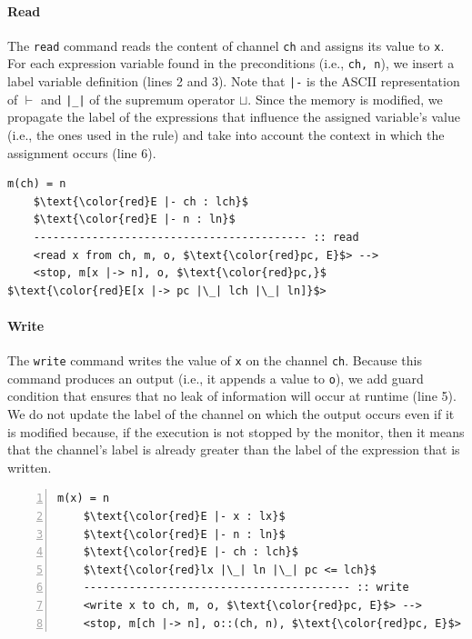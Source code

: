 \documentclass[conference]{IEEEtran}
\begin{document}
\paragraph{Read}
The \lstinline{read} command reads the content of channel \lstinline{ch} and assigns its value to \lstinline{x}. For each expression variable found in the preconditions (i.e., \lstinline{ch, n}), we insert a label variable definition (lines 2 and 3). Note that \lstinline{|-} is the ASCII representation of $\vdash$ and \lstinline{|_|} of the supremum operator $\sqcup$. Since the memory is modified, we propagate the label of the expressions that influence the assigned variable's value (i.e., the ones used in the rule) and take into account the context in which the assignment occurs (line 6).
\begin{lstlisting}[label=listing:output-semantics-read,captionpos=b,numbers=right,caption=Ott-IFC's output for the "read" command]
	m(ch) = n
	$\text{\color{red}E |- ch : lch}$
	$\text{\color{red}E |- n : ln}$
	------------------------------------------ :: read
	<read x from ch, m, o, $\text{\color{red}pc, E}$> --> 
	<stop, m[x |-> n], o, $\text{\color{red}pc,}$ $\text{\color{red}E[x |-> pc |\_| lch |\_| ln]}$>
\end{lstlisting}

\paragraph{Write} The \lstinline{write} command writes the value of \lstinline{x} on the channel \lstinline{ch}. Because this command produces an output (i.e., it appends a value to \lstinline{o}), we add guard condition that ensures that no leak of information will occur at runtime (line 5). We do not update the label of the channel on which the output occurs even if it is modified because, if the execution is not stopped by the monitor, then it means that the channel's label is already greater than the label of the expression that is written.
\begin{lstlisting}[label=listing:output-semantics-write,numbers=left,captionpos=b,caption=Ott-IFC's output for the "write" command]
	m(x) = n
	$\text{\color{red}E |- x : lx}$
	$\text{\color{red}E |- n : ln}$
	$\text{\color{red}E |- ch : lch}$
	$\text{\color{red}lx |\_| ln |\_| pc <= lch}$
	----------------------------------------- :: write
	<write x to ch, m, o, $\text{\color{red}pc, E}$> --> 
	<stop, m[ch |-> n], o::(ch, n), $\text{\color{red}pc, E}$>
\end{lstlisting}
\end{document}
